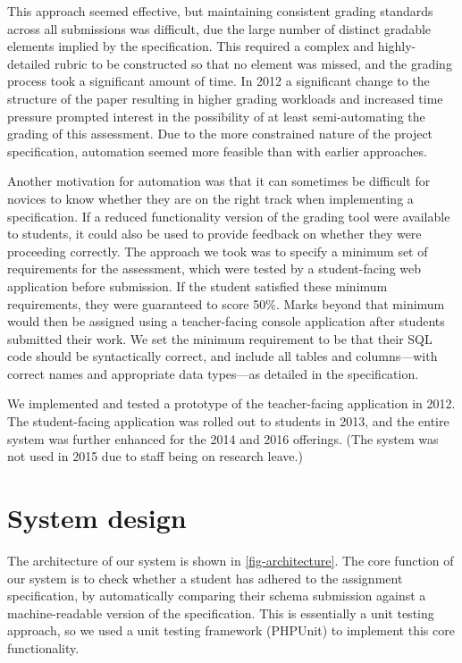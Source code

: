 \documentclass[sigconf, authordraft, capitalise]{acmart}
\begin{document}
This approach seemed effective, but maintaining consistent grading standards across all submissions was difficult, due the large number of distinct gradable elements implied by the specification. This required a complex and highly-detailed rubric to be constructed so that no element was missed, and the grading process took a significant amount of time. In 2012 a significant change to the structure of the paper resulting in higher grading workloads and increased time pressure prompted interest in the possibility of at least semi-automating the grading of this assessment. Due to the more constrained nature of the project specification, automation seemed more feasible than with earlier approaches.

Another motivation for automation was that it can sometimes be difficult for novices to know whether they are on the right track when implementing a specification. If a reduced functionality version of the grading tool were available to students, it could also be used to provide feedback on whether they were proceeding correctly. The approach we took was to specify a minimum set of requirements for the assessment, which were tested by a student-facing web application before submission. If the student satisfied these minimum requirements, they were guaranteed to score 50\%. Marks beyond that minimum would then be assigned using a teacher-facing console application after students submitted their work. We set the minimum requirement to be that their SQL code should be syntactically correct, and include all tables and columns---with correct names and appropriate data types---as detailed in the specification.

We implemented and tested a prototype of the teacher-facing application in 2012. The student-facing application was rolled out to students in 2013, and the entire system was further enhanced for the 2014 and 2016 offerings. (The system was not used in 2015 due to staff being on research leave.)


\section{System design}
\label{sec-design}

The architecture of our system is shown in \cref{fig-architecture}. The core function of our system is to check whether a student has adhered to the assignment specification, by automatically comparing their schema submission against a machine-readable version of the specification. This is essentially a unit testing approach, so we used a unit testing framework (PHPUnit) to implement this core functionality.
\end{document}
